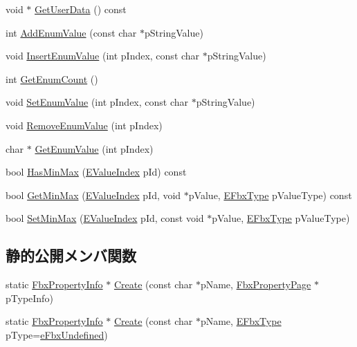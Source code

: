 \begin{DoxyCompactItemize}
\item 
void $\ast$ \hyperlink{class_fbx_property_info_a477a09fa03362948cbb168663de05690}{Get\+User\+Data} () const
\item 
int \hyperlink{class_fbx_property_info_a47286c778cd759d4c1e8d37f7a4ca785}{Add\+Enum\+Value} (const char $\ast$p\+String\+Value)
\item 
void \hyperlink{class_fbx_property_info_a65d9761825670a7b2a158685b10657d3}{Insert\+Enum\+Value} (int p\+Index, const char $\ast$p\+String\+Value)
\item 
int \hyperlink{class_fbx_property_info_a2e3ef1eee0572361f877fb0206df15e2}{Get\+Enum\+Count} ()
\item 
void \hyperlink{class_fbx_property_info_abd702c3f559e3c264e6ecbc261f5a57b}{Set\+Enum\+Value} (int p\+Index, const char $\ast$p\+String\+Value)
\item 
void \hyperlink{class_fbx_property_info_ad76228d49b0ca38bc402f0e8fe2f3850}{Remove\+Enum\+Value} (int p\+Index)
\item 
char $\ast$ \hyperlink{class_fbx_property_info_afc7d5c0e13d772fdf6c392fc922ebc09}{Get\+Enum\+Value} (int p\+Index)
\item 
bool \hyperlink{class_fbx_property_info_a1a65cdd1e8e312570977b7a394bb760f}{Has\+Min\+Max} (\hyperlink{class_fbx_property_info_a83069f079a29bde133f2e9324de5af43}{E\+Value\+Index} p\+Id) const
\item 
bool \hyperlink{class_fbx_property_info_aa21fd9cc302856625f4a993a781b208f}{Get\+Min\+Max} (\hyperlink{class_fbx_property_info_a83069f079a29bde133f2e9324de5af43}{E\+Value\+Index} p\+Id, void $\ast$p\+Value, \hyperlink{fbxpropertytypes_8h_a73913a5ddfb20e57c6f25e9e6784bd92}{E\+Fbx\+Type} p\+Value\+Type) const
\item 
bool \hyperlink{class_fbx_property_info_a9edba58ea8139407afbaf58d06ed03b4}{Set\+Min\+Max} (\hyperlink{class_fbx_property_info_a83069f079a29bde133f2e9324de5af43}{E\+Value\+Index} p\+Id, const void $\ast$p\+Value, \hyperlink{fbxpropertytypes_8h_a73913a5ddfb20e57c6f25e9e6784bd92}{E\+Fbx\+Type} p\+Value\+Type)
\end{DoxyCompactItemize}
\subsection*{静的公開メンバ関数}
\begin{DoxyCompactItemize}
\item 
static \hyperlink{class_fbx_property_info}{Fbx\+Property\+Info} $\ast$ \hyperlink{class_fbx_property_info_a17f842fb2c82eb02053ea4b7e2dacc6f}{Create} (const char $\ast$p\+Name, \hyperlink{class_fbx_property_page}{Fbx\+Property\+Page} $\ast$p\+Type\+Info)
\item 
static \hyperlink{class_fbx_property_info}{Fbx\+Property\+Info} $\ast$ \hyperlink{class_fbx_property_info_a8cf0ec9c51968ff02688038fe93de49a}{Create} (const char $\ast$p\+Name, \hyperlink{fbxpropertytypes_8h_a73913a5ddfb20e57c6f25e9e6784bd92}{E\+Fbx\+Type} p\+Type=\hyperlink{fbxpropertytypes_8h_a73913a5ddfb20e57c6f25e9e6784bd92a150b400dddd0f8b5c7e22a1bba0721d8}{e\+Fbx\+Undefined})
\end{DoxyCompactItemize}


